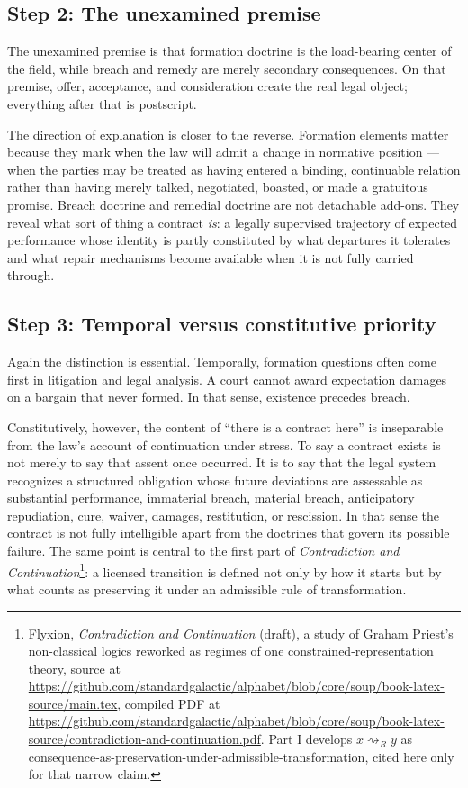 \documentclass[11pt]{article}
\begin{document}
\subsection{Step 2: The unexamined premise}
The unexamined premise is that formation doctrine is the load-bearing center of the field, while breach and remedy are merely secondary consequences. On that premise, offer, acceptance, and consideration create the real legal object; everything after that is postscript.

The direction of explanation is closer to the reverse. Formation elements matter because they mark when the law will admit a change in normative position --- when the parties may be treated as having entered a binding, continuable relation rather than having merely talked, negotiated, boasted, or made a gratuitous promise. Breach doctrine and remedial doctrine are not detachable add-ons. They reveal what sort of thing a contract \emph{is}: a legally supervised trajectory of expected performance whose identity is partly constituted by what departures it tolerates and what repair mechanisms become available when it is not fully carried through.

\subsection{Step 3: Temporal versus constitutive priority}
Again the distinction is essential. Temporally, formation questions often come first in litigation and legal analysis. A court cannot award expectation damages on a bargain that never formed. In that sense, existence precedes breach.

Constitutively, however, the content of ``there is a contract here'' is inseparable from the law's account of continuation under stress. To say a contract exists is not merely to say that assent once occurred. It is to say that the legal system recognizes a structured obligation whose future deviations are assessable as substantial performance, immaterial breach, material breach, anticipatory repudiation, cure, waiver, damages, restitution, or rescission. In that sense the contract is not fully intelligible apart from the doctrines that govern its possible failure. The same point is central to the first part of \textit{Contradiction and Continuation}\footnote{Flyxion, \emph{Contradiction and Continuation} (draft), a study of Graham Priest's non-classical logics reworked as regimes of one constrained-representation theory, source at \url{https://github.com/standardgalactic/alphabet/blob/core/soup/book-latex-source/main.tex}, compiled PDF at \url{https://github.com/standardgalactic/alphabet/blob/core/soup/book-latex-source/contradiction-and-continuation.pdf}. Part I develops $x\rightsquigarrow_R y$ as consequence-as-preservation-under-admissible-transformation, cited here only for that narrow claim.}: a licensed transition is defined not only by how it starts but by what counts as preserving it under an admissible rule of transformation.
\end{document}
